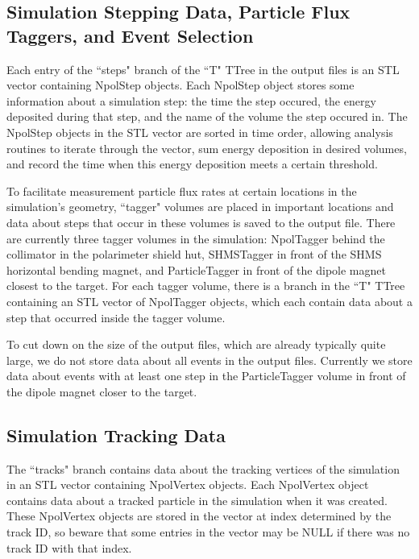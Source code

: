\documentclass[10pt,titlepage]{article}
\begin{document}
\subsection{Simulation Stepping Data, Particle Flux Taggers, and Event Selection}

Each entry of the ``steps" branch of the ``T" TTree in the output files is an STL vector containing NpolStep objects.  Each NpolStep object stores some information about a simulation step: the time the step occured, the energy deposited during that step, and the name of the volume the step occured in.  The NpolStep objects in the STL vector are sorted in time order, allowing analysis routines to iterate through the vector, sum energy deposition in desired volumes, and record the time when this energy deposition meets a certain threshold.

To facilitate measurement particle flux rates at certain locations in the simulation's geometry, ``tagger" volumes are placed in important locations and data about steps that occur in these volumes is saved to the output file.  There are currently three tagger volumes in the simulation: NpolTagger behind the collimator in the polarimeter shield hut, SHMSTagger in front of the SHMS horizontal bending magnet, and ParticleTagger in front of the dipole magnet closest to the target.  For each tagger volume, there is a branch in the ``T" TTree containing an STL vector of NpolTagger objects, which each contain data about a step that occurred inside the tagger volume.

To cut down on the size of the output files, which are already typically quite large, we do not store data about all events in the output files.  Currently we store data about events with at least one step in the ParticleTagger volume in front of the dipole magnet closer to the target.

\subsection{Simulation Tracking Data}

The ``tracks" branch contains data about the tracking vertices of the simulation in an STL vector containing NpolVertex objects.  Each NpolVertex object contains data about a tracked particle in the simulation when it was created.  These NpolVertex objects are stored in the vector at index determined by the track ID, so beware that some entries in the vector may be NULL if there was no track ID with that index.
\end{document}
